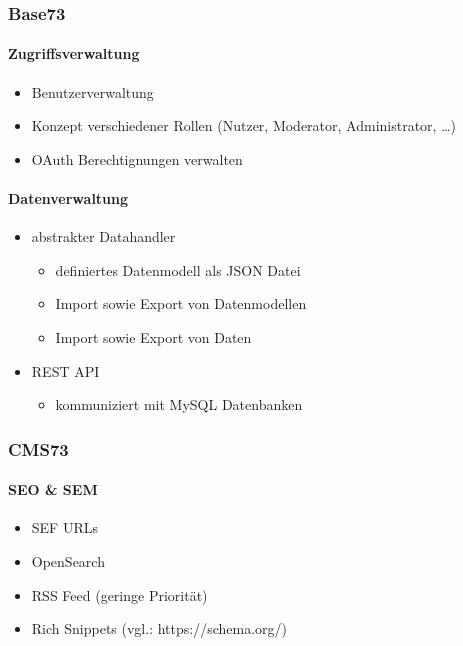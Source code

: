 \subsubsection{Base73}
    \paragraph{Zugriffsverwaltung}
        \begin{itemize}
            \item Benutzerverwaltung
            \item Konzept verschiedener Rollen (Nutzer, Moderator, Administrator, \ldots)
            \item OAuth Berechtignungen verwalten
        \end{itemize}
    \paragraph{Datenverwaltung}
		\begin{itemize}
			\item abstrakter Datahandler
                \begin{itemize}
                    \item definiertes Datenmodell als JSON Datei
                    \item Import sowie Export von Datenmodellen
                    \item Import sowie Export von Daten
                \end{itemize}
            \item REST API
                \begin{itemize}
                    \item kommuniziert mit MySQL Datenbanken
                \end{itemize}
		\end{itemize}


\subsubsection{CMS73}
	\paragraph{SEO \& SEM}
		\begin{itemize}
			\item SEF URLs
			\item OpenSearch
			\item RSS Feed (geringe Priorität)
			\item Rich Snippets (vgl.: https://schema.org/)
		\end{itemize}
	
